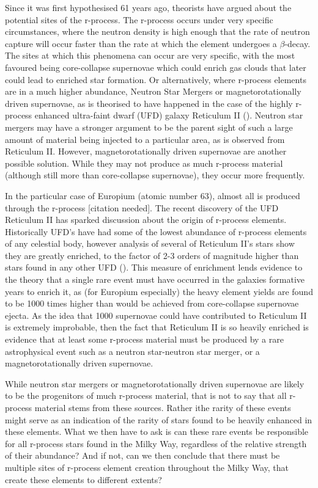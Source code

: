 \documentclass[a4paper,fleqn,usenatbib]{mnras}
\begin{document}
Since it was first hypothesised 61 years ago, theorists have argued about the potential sites of the r-process. The r-process occurs under very specific circumstances, where the neutron density is high enough that the rate of neutron capture will occur faster than the rate at which the element undergoes a $\beta$-decay. The sites at which this phenomena can occur are very specific, with the most favoured being core-collapse supernovae which could enrich gas clouds that later could lead to enriched star formation. Or alternatively, where r-process elements are in a much higher abundance, Neutron Star Mergers or magnetorotationally driven supernovae, as is theorised to have happened in the case of the highly r-process enhanced ultra-faint dwarf (UFD) galaxy Reticulum II (\cite{Ji2016}). Neutron star mergers may have a stronger argument to be the parent sight of such a large amount of material being injected to a particular area, as is observed from Reticulum II. However, magnetorotationally driven supernovae are another possible solution. While they may not produce as much r-process material (although still more than core-collapse supernovae), they occur more frequently.

In the particular case of Europium (atomic number 63), almost all is produced through the r-process [citation needed]. The recent discovery of the UFD Reticulum II has sparked discussion about the origin of r-process elements. Historically UFD's have had some of the lowest abundance of r-process elements of any celestial body, however analysis of several of Reticulum II's stars show they are greatly enriched, to the factor of 2-3 orders of magnitude higher than stars found in any other UFD (\cite{Ji2016}). This measure of enrichment lends evidence to the theory that a single rare event must have occurred in the galaxies formative years to enrich it, as (for Europium especially) the heavy element yields are found to be 1000 times higher than would be achieved from core-collapse supernovae ejecta. As the idea that 1000 supernovae could have contributed to Reticulum II is extremely improbable, then the fact that Reticulum II is so heavily enriched is evidence that at least some r-process material must be produced by a rare astrophysical event such as a neutron star-neutron star merger, or a magnetorotationally driven supernovae.

While neutron star mergers or magnetorotationally driven supernovae are likely to be the progenitors of much r-process material, that is not to say that all r-process material stems from these sources. Rather ithe rarity of these events might serve as an indication of the rarity of stars found to be heavily enhanced in these elements. What we then have to ask is can these rare events be responsible for all r-process stars found in the Milky Way, regardless of the relative strength of their abundance? And if not, can we then conclude that there must be multiple sites of r-process element creation throughout the Milky Way, that create these elements to different extents?
\end{document}
